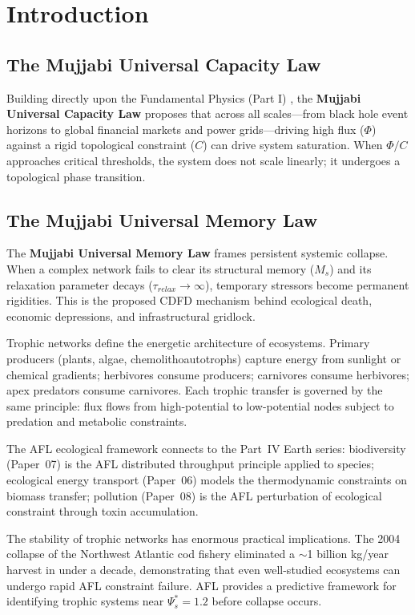 \documentclass[11pt]{article}
\begin{document}
\section{Introduction}


\subsection{The Mujjabi Universal Capacity Law}
Building directly upon the Fundamental Physics (Part I) \cite{MujjabiPartI2026}, the \textbf{Mujjabi Universal Capacity Law} proposes that across all scales---from black hole event horizons to global financial markets and power grids---driving high flux ($\Phi$) against a rigid topological constraint ($C$) can drive system saturation. When $\Phi/C$ approaches critical thresholds, the system does not scale linearly; it undergoes a topological phase transition.

\subsection{The Mujjabi Universal Memory Law}
The \textbf{Mujjabi Universal Memory Law} frames persistent systemic collapse. When a complex network fails to clear its structural memory ($M_s$) and its relaxation parameter decays ($\tau_{relax} \to \infty$), temporary stressors become permanent rigidities. This is the proposed CDFD mechanism behind ecological death, economic depressions, and infrastructural gridlock.


Trophic networks define the energetic architecture of ecosystems. Primary producers (plants,
algae, chemolithoautotrophs) capture energy from sunlight or chemical gradients; herbivores
consume producers; carnivores consume herbivores; apex predators consume carnivores. Each
trophic transfer is governed by the same principle: flux flows from high-potential to
low-potential nodes subject to predation and metabolic constraints.

The AFL ecological framework connects to the Part~IV Earth series: biodiversity (Paper~07)
is the AFL distributed throughput principle applied to species; ecological energy transport
(Paper~06) models the thermodynamic constraints on biomass transfer; pollution (Paper~08) is
the AFL perturbation of ecological constraint through toxin accumulation.

The stability of trophic networks has enormous practical implications. The 2004 collapse of
the Northwest Atlantic cod fishery eliminated a $\sim$1 billion kg/year harvest in under a
decade, demonstrating that even well-studied ecosystems can undergo rapid AFL constraint failure.
AFL provides a predictive framework for identifying trophic systems near $\Psi_s^* = 1.2$ before
collapse occurs.
\end{document}
